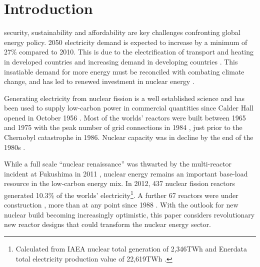 \documentclass[journal]{IEEEtran}
\begin{document}






%

\section{Introduction}

 security, sustainability and affordability are key challenges confronting global energy policy. 
2050 electricity demand is expected to increase by a minimum of 27\% compared to 2010. 
This is due to the electrification of transport and heating in developed countries and increasing demand in developing countries \cite{Kim201}.
This insatiable demand for more energy must be reconciled with combating climate change, and has led to renewed investment in nuclear energy \cite{schneider2012nuclear}.

Generating electricity from nuclear fission is a well established science and has been used to supply low-carbon power in commercial quantities since Calder Hall opened in October 1956 \cite{NDA2007}.
Most of the worlds' reactors were built between 1965 and 1975 with the peak number of grid connections in 1984 \cite{schneider2012nuclear}, just prior to the Chernobyl catastrophe in 1986.
Nuclear capacity was in decline by the end of the 1980s \cite{schneider2012nuclear}.

While a full scale ``nuclear renaissance'' was thwarted by the multi-reactor incident at Fukushima in 2011 \cite{Guidolin20121746}, nuclear energy remains an important base-load resource in the low-carbon energy mix. 
In 2012, 437 nuclear fission reactors generated 10.3\% of the worlds' electricity\footnote{Calculated from IAEA nuclear total generation \cite{IAEAReactors2013} of 2,346TWh and Enerdata total electricity production value of 22,619TWh \cite{Enerdata}.}. 
A further 67 reactors were under construction \cite{IAEAReactors2013}, more than at any point since 1988 \cite{schneider2012nuclear}.
With the outlook for new nuclear build becoming increasingly optimistic, this paper considers revolutionary new reactor designs that could transform the nuclear energy sector.
\end{document}
